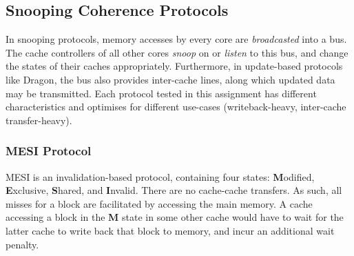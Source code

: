 \documentclass[date,tikzlibs,lmodern,10pt]{epreport}
\begin{document}
\subsection{Snooping Coherence Protocols}
In snooping protocols, memory accesses by every core are \emph{broadcasted} into a bus.
The cache controllers of all other cores \emph{snoop} on or \emph{listen} to this bus, and change the states of their caches appropriately.
Furthermore, in update-based protocols like Dragon, the bus also provides inter-cache lines, along which updated data may be transmitted.
Each protocol tested in this assignment has different characteristics and optimises for different use-cases (writeback-heavy, inter-cache transfer-heavy).

\subsubsection{MESI Protocol}
MESI is an invalidation-based protocol, containing four states: \textbf{M}odified, \textbf{E}xclusive, \textbf{S}hared, and \textbf{I}nvalid. There are no cache-cache transfers.
As such, all misses for a block are facilitated by accessing the main memory.
A cache accessing a block in the \textbf{M} state in some other cache would have to wait for the latter cache to write back that block to memory, and incur an additional wait penalty.
\end{document}
